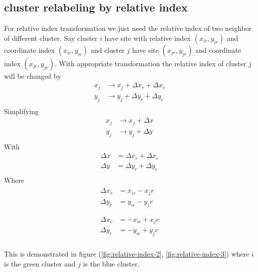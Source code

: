 \subsection{cluster relabeling by relative index}
For relative index transformation we just need the relative index of two neighbor of different cluster. Say cluster $i$ have site with relative index $(x_{ir},y_{ir})$  and coordinate index $(x_{ic},y_{ic})$ and cluster $j$ have site $(x_{jr},y_{jr})$ and coordinate index $(x_{jc},y_{jc})$.
With appropriate transformation the relative index of cluster $j$ will be changed by
\begin{equation}
\begin{split}
	x_j &\rightarrow x_j + \Delta x_r + \Delta x_c \\
	y_j &\rightarrow y_j + \Delta y_r + \Delta y_c \\
\end{split}
\end{equation}
Simplifying
\begin{equation}
\begin{split}
	x_j &\rightarrow x_j + \Delta x \\
	y_j &\rightarrow y_j + \Delta y \\
\end{split}
\end{equation}
With
\begin{equation}
\begin{split}
\Delta x &= \Delta x_r + \Delta x_c  \\
\Delta y &= \Delta y_r + \Delta y_c  \\
\end{split}
\end{equation}
Where
\begin{align}
\begin{split}
\Delta x_r &= x_{ir}-{x_jr}  \\
\Delta y_r &= y_{ir}-{y_jr}  \\
\end{split}
\\
\begin{split}
\Delta x_c &= -x_{ic}+{x_jc} \\
\Delta y_c &= -y_{ic}+{y_jc}  \\
\end{split}
\end{align}

This is demonstrated in figure (\ref{fig:relative-index-2}, \ref{fig:relative-index-3}) where $i$ is the green cluster and $j$ is the blue cluster. 

